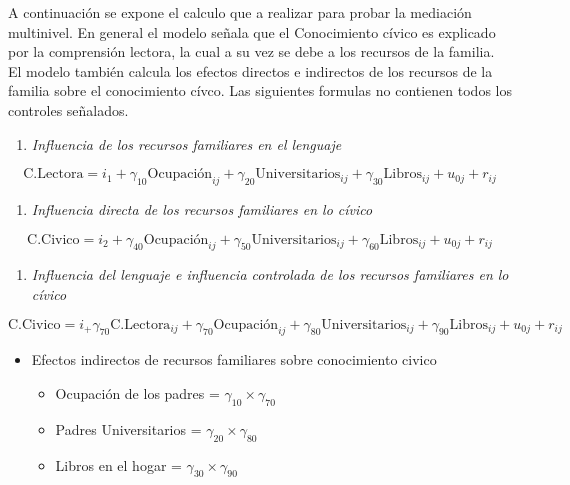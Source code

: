 \documentclass[12pt,twoside]{templates/facsothesis}
\providecommand{\tightlist}{%
  \setlength{\itemsep}{0pt}\setlength{\parskip}{0pt}}
\begin{document}
A continuación se expone el calculo que a realizar para probar la mediación multinivel. En general el modelo señala que el Conocimiento cívico es explicado por la comprensión lectora, la cual a su vez se debe a los recursos de la familia. El modelo también calcula los efectos directos e indirectos de los recursos de la familia sobre el conocimiento cívco. Las siguientes formulas no contienen todos los controles señalados.

\begin{enumerate}
\def\labelenumi{\alph{enumi})}
\tightlist
\item
  \emph{Influencia de los recursos familiares en el lenguaje}
\end{enumerate}

\begin{equation}
\text{C.Lectora}= i_1 +\gamma_{10}\text{Ocupación}_{ij} + \gamma_{20}\text{Universitarios}_{ij}+ \gamma_{30}\text{Libros}_{ij}+u_{0j}+r_{ij}
\end{equation}

\begin{enumerate}
\def\labelenumi{\alph{enumi})}
\setcounter{enumi}{1}
\tightlist
\item
  \emph{Influencia directa de los recursos familiares en lo cívico}
\end{enumerate}

\begin{equation}
\text{C.Civico}= i_2+\gamma_{40}\text{Ocupación}_{ij} + \gamma_{50}\text{Universitarios}_{ij}+ \gamma_{60}\text{Libros}_{ij}+u_{0j}+r_{ij}
\end{equation}

\begin{enumerate}
\def\labelenumi{\alph{enumi})}
\setcounter{enumi}{2}
\tightlist
\item
  \emph{Influencia del lenguaje e influencia controlada de los recursos familiares en lo cívico}
\end{enumerate}

\begin{equation}
\text{C.Civico}= i_+\gamma_{70}\text{C.Lectora}_{ij}+\gamma_{70}\text{Ocupación}_{ij} + \gamma_{80}\text{Universitarios}_{ij}+ \gamma_{90}\text{Libros}_{ij}+u_{0j}+r_{ij}
\end{equation}

\begin{itemize}
\item
  Efectos indirectos de recursos familiares sobre conocimiento civico

  \begin{itemize}
  \item
    Ocupación de los padres = \(\gamma_{10}\times\gamma_{70}\)
  \item
    Padres Universitarios = \(\gamma_{20}\times\gamma_{80}\)
  \item
    Libros en el hogar = \(\gamma_{30}\times\gamma_{90}\)
  \end{itemize}
\end{itemize}
\end{document}
